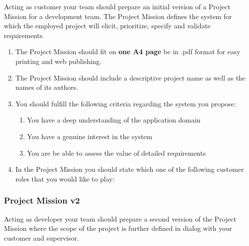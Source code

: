 \documentclass[10pt,a4paper]{article}
\begin{document}
Acting as customer your team should prepare an initial version of a Project Mission for a development team. The Project Mission defines the system for which the employed project will elicit, prioritize, specify and validate requirements.

 \begin{enumerate}[noitemsep]
 \item The Project Mission should fit on {\bf one A4 page} be in .pdf format for easy printing and web publishing. 
 \item The Project Mission should include a descriptive project name as well as the names of its authors.


\item You should fulfill the following criteria regarding the system you propose:
\begin{enumerate}
\item You have a deep understanding of the application domain 
\item You have a genuine interest in the system 
\item You are be able to assess the value of detailed requirements 
\end{enumerate}
\item In the Project Mission you should state which one of the following customer roles that you would like to play:
\end{enumerate}

\subsubsection{Project Mission v2}
Acting as developer your team should prepare a second version of the Project Mission where the scope of the project is further defined in dialog with your customer and supervisor. 
 
\end{document}
